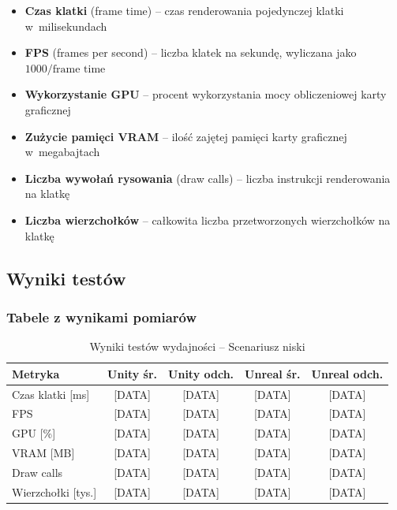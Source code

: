 \begin{itemize}
    \item \textbf{Czas klatki} (frame time) -- czas renderowania pojedynczej klatki w~milisekundach
    \item \textbf{FPS} (frames per second) -- liczba klatek na sekundę, wyliczana jako $1000 / \text{frame time}$
    \item \textbf{Wykorzystanie GPU} -- procent wykorzystania mocy obliczeniowej karty graficznej
    \item \textbf{Zużycie pamięci VRAM} -- ilość zajętej pamięci karty graficznej w~megabajtach
    \item \textbf{Liczba wywołań rysowania} (draw calls) -- liczba instrukcji renderowania na klatkę
    \item \textbf{Liczba wierzchołków} -- całkowita liczba przetworzonych wierzchołków na klatkę
\end{itemize}

\subsection{Wyniki testów}

\subsubsection{Tabele z wynikami pomiarów}

\begin{table}[h!]
    \centering
    \caption{Wyniki testów wydajności -- Scenariusz niski}
    \label{tab:results-low}
    \begin{tabular}{|l|c|c|c|c|}
        \hline
        \textbf{Metryka} & \textbf{Unity śr.} & \textbf{Unity odch.} & \textbf{Unreal śr.} & \textbf{Unreal odch.} \\
        \hline\hline
        Czas klatki [ms] & [DATA] & [DATA] & [DATA] & [DATA] \\
        \hline
        FPS & [DATA] & [DATA] & [DATA] & [DATA] \\
        \hline
        GPU [\%] & [DATA] & [DATA] & [DATA] & [DATA] \\
        \hline
        VRAM [MB] & [DATA] & [DATA] & [DATA] & [DATA] \\
        \hline
        Draw calls & [DATA] & [DATA] & [DATA] & [DATA] \\
        \hline
        Wierzchołki [tys.] & [DATA] & [DATA] & [DATA] & [DATA] \\
        \hline
    \end{tabular}
\end{table}

